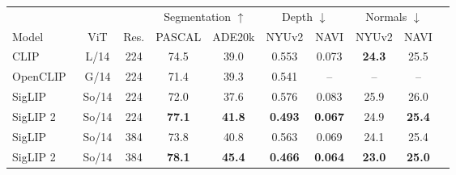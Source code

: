 \begin{tabular}{lccccccccc}
\toprule
 & & & \multicolumn{2}{c}{Segmentation $\uparrow$} & \multicolumn{2}{c}{Depth $\downarrow$} & \multicolumn{2}{c}{Normals $\downarrow$}\\
 \cmidrule(lr){4-5} \cmidrule(lr){6-7} \cmidrule(lr){8-9}
Model & ViT & Res. & PASCAL & ADE20k & NYUv2 & NAVI & NYUv2 & NAVI \\
\midrule
CLIP~\cite{clip} & L/14 & 224 & 74.5 & 39.0 & 0.553 & 0.073 & \bf{24.3} & 25.5 \\
OpenCLIP~\cite{ilharco2021open} & G/14 & 224 & 71.4 & 39.3 & 0.541 & -- & -- & -- \\
SigLIP~\cite{siglip} & So/14 & 224 & 72.0 & 37.6 & 0.576 & 0.083 & 25.9 & 26.0 \\
SigLIP 2 & So/14 & 224 & \bf{77.1} & \bf{41.8} & \bf{0.493} & \bf{0.067} & 24.9 & \bf{25.4} \\ \midrule
SigLIP~\cite{siglip} & So/14 & 384 & 73.8 & 40.8 & 0.563 & 0.069 & 24.1 & 25.4 \\
SigLIP 2 & So/14 & 384 & \bf{78.1} & \bf{45.4} & \bf{0.466} & \bf{0.064} & \bf{23.0} & \bf{25.0} \\
\bottomrule
\end{tabular}